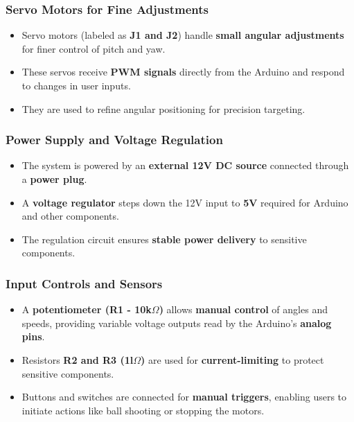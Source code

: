 \documentclass[12pt]{article}
\begin{document}
\subsubsection{Servo Motors for Fine Adjustments}

\begin{itemize}
    \item Servo motors (labeled as \textbf{J1 and J2}) handle \textbf{small angular adjustments} for finer control of pitch and yaw.
    \item These servos receive \textbf{PWM signals} directly from the Arduino and respond to changes in user inputs.
    \item They are used to refine angular positioning for precision targeting.
\end{itemize}

\subsubsection{Power Supply and Voltage Regulation}

\begin{itemize}
    \item The system is powered by an \textbf{external 12V DC source} connected through a \textbf{power plug}.
    \item A \textbf{voltage regulator} steps down the 12V input to \textbf{5V} required for Arduino and other components.
    \item The regulation circuit ensures \textbf{stable power delivery} to sensitive components.
\end{itemize}

\subsubsection{Input Controls and Sensors}

\begin{itemize}
    \item A \textbf{potentiometer (R1 - 10k{$\Omega$})} allows \textbf{manual control}  of angles and speeds, providing variable voltage outputs read by the Arduino’s \textbf{analog pins}.
    \item Resistors \textbf{R2 and R3 (1l{$\Omega$})} are used for \textbf{current-limiting} to protect sensitive components.
    \item Buttons and switches are connected for \textbf{manual triggers}, enabling users to initiate actions like ball shooting or stopping the motors.
\end{itemize}
\end{document}
